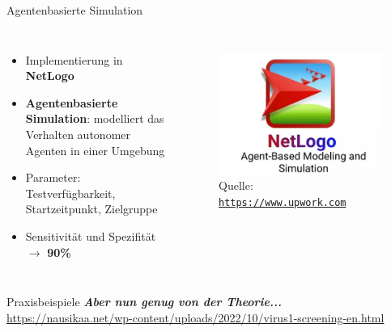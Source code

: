 \documentclass[ngerman,14pt,aspectratio=1610]{beamer}
\begin{document}
	\begin{frame}[t]{Agentenbasierte Simulation} \vspace{30pt}		
		\begin{columns}[T, onlytextwidth]
			\begin{itemize}
				\item Implementierung in  \textbf{NetLogo}
				\item  \textbf{Agentenbasierte Simulation}: modelliert das Verhalten autonomer Agenten in einer Umgebung
				\item Parameter: Testverfügbarkeit, Startzeitpunkt, Zielgruppe
				\item Sensitivität und Spezifität $\rightarrow$ \textbf{90\%}
			\end{itemize}
			
			\begin{figure}[h]
				\centering
				\includegraphics[width=\linewidth]{netlogo}
				\tiny Quelle: \href{https://www.upwork.com/services/product/development-it-a-netlogo-agent-based-simulation-model-1351194777425215488}{\texttt{https://www.upwork.com}}
			\end{figure}
			
		\end{columns}
	\end{frame}
	
	\begin{frame}[t]{Praxisbeispiele} \vspace{60pt}
		\textbf{\textit{Aber nun genug von der Theorie...}}\\
		\bigskip
		\url{https://nausikaa.net/wp-content/uploads/2022/10/virus1-screening-en.html}
	\end{frame}
	
\end{document}
